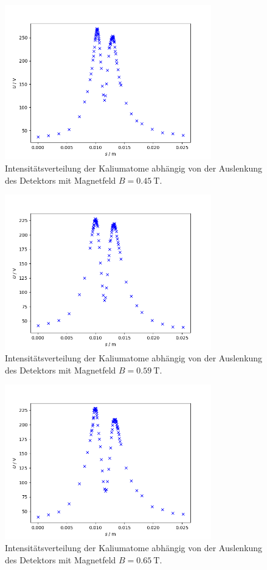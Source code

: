 \begin{figure}
\centering
\includegraphics[width=0.8\textwidth]{python/plots/plot_5.png}
\caption{Intensitätsverteilung der Kaliumatome abhängig von der Auslenkung des Detektors mit Magnetfeld $B=\SI{0.45}{\tesla}$.}
\label{fig:a:5}
\end{figure}
\begin{figure}
\centering
\includegraphics[width=0.8\textwidth]{python/plots/plot_6.png}
\caption{Intensitätsverteilung der Kaliumatome abhängig von der Auslenkung des Detektors mit Magnetfeld $B=\SI{0.59}{\tesla}$.}
\label{fig:a:6}
\end{figure}
\begin{figure}
\centering
\includegraphics[width=0.8\textwidth]{python/plots/plot_7.png}
\caption{Intensitätsverteilung der Kaliumatome abhängig von der Auslenkung des Detektors mit Magnetfeld $B=\SI{0.65}{\tesla}$.}
\label{fig:a:7}
\end{figure}
